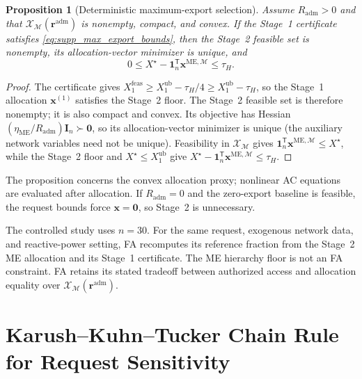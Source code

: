 \documentclass[11pt]{article}
\newtheorem{proposition}{Proposition}
\begin{document}
\begin{proposition}[Deterministic maximum-export selection]
\label{prop:supp_deterministic_me}
Assume $R_{\mathrm{adm}}>0$ and that
$\mathcal X_{\mathcal M}(\mathbf r^{\mathrm{adm}})$ is nonempty, compact, and convex. If the
Stage~1 certificate satisfies \eqref{eq:supp_max_export_bounds}, then the
Stage~2 feasible set is nonempty, its allocation-vector minimizer is unique,
and
\begin{equation}
0\le X^\star-
\mathbf 1_n^{\mathsf T}\mathbf x^{\mathrm{ME},\mathcal M}
\le\tau_H.
\label{eq:supp_primary_objective_loss}
\end{equation}
\end{proposition}

\begin{proof}
The certificate gives
$X_1^{\mathrm{feas}}\ge X_1^{\mathrm{ub}}-\tau_H/4
\ge X_1^{\mathrm{ub}}-\tau_H$, so the Stage~1 allocation
$\mathbf x^{(1)}$ satisfies the Stage~2 floor. The Stage~2 feasible set is
therefore nonempty; it is also compact and convex. Its objective has Hessian
$(\eta_{\mathrm{ME}}/R_{\mathrm{adm}})\mathbf I_n\succ\mathbf0$, so its
allocation-vector minimizer is unique (the auxiliary network variables need
not be unique). Feasibility in $\mathcal X_{\mathcal M}$ gives
$\mathbf 1_n^{\mathsf T}\mathbf x^{\mathrm{ME},\mathcal M}\le X^\star$, while
the Stage~2 floor and $X^\star\le X_1^{\mathrm{ub}}$ give
$X^\star-\mathbf 1_n^{\mathsf T}\mathbf x^{\mathrm{ME},\mathcal M}\le\tau_H$.
\end{proof}

The proposition concerns the convex allocation proxy; nonlinear AC equations
are evaluated after allocation. If $R_{\mathrm{adm}}=0$ and the zero-export
baseline is feasible, the request bounds force $\mathbf x=\mathbf0$, so Stage~2
is unnecessary.

The controlled study uses $n=30$. For the same request, exogenous network data,
and reactive-power setting, FA recomputes its reference fraction from the
Stage~2 ME allocation and its Stage~1 certificate. The ME hierarchy floor is not
an FA constraint. FA retains its stated tradeoff between authorized access and
allocation equality over $\mathcal X_{\mathcal M}(\mathbf r^{\mathrm{adm}})$.

\section{Karush--Kuhn--Tucker Chain Rule for Request Sensitivity}
\label{supp:kkt_sensitivity}
\end{document}
